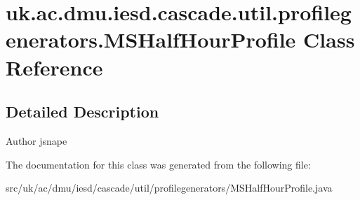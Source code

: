 \hypertarget{classuk_1_1ac_1_1dmu_1_1iesd_1_1cascade_1_1util_1_1profilegenerators_1_1_m_s_half_hour_profile}{\section{uk.\-ac.\-dmu.\-iesd.\-cascade.\-util.\-profilegenerators.\-M\-S\-Half\-Hour\-Profile Class Reference}
\label{classuk_1_1ac_1_1dmu_1_1iesd_1_1cascade_1_1util_1_1profilegenerators_1_1_m_s_half_hour_profile}
}


\subsection{Detailed Description}
\begin{DoxyAuthor}{Author}
jsnape 
\end{DoxyAuthor}


The documentation for this class was generated from the following file\-:\begin{DoxyCompactItemize}
\item 
src/uk/ac/dmu/iesd/cascade/util/profilegenerators/M\-S\-Half\-Hour\-Profile.\-java\end{DoxyCompactItemize}

